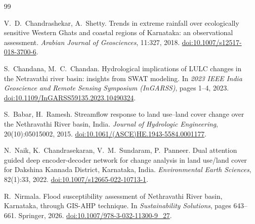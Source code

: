 \documentclass[11pt,a4paper]{article}
\begin{document}

\begin{thebibliography}{99}
\setlength{\itemsep}{1pt}

V.~D.~Chandrashekar, A.~Shetty.
Trends in extreme rainfall over ecologically sensitive Western Ghats and coastal
regions of Karnataka: an observational assessment.
\emph{Arabian Journal of Geosciences}, 11:327, 2018.
\href{https://doi.org/10.1007/s12517-018-3700-6}{doi:10.1007/s12517-018-3700-6}.

S.~Chandana, M.~C.~Chandan.
Hydrological implications of LULC changes in the Netravathi river basin:
insights from SWAT modeling.
In \emph{2023 IEEE India Geoscience and Remote Sensing Symposium (InGARSS)},
pages 1--4, 2023.
\href{https://doi.org/10.1109/InGARSS59135.2023.10490324}{doi:10.1109/InGARSS59135.2023.10490324}.

S.~Babar, H.~Ramesh.
Streamflow response to land use--land cover change over the Nethravathi River
basin, India.
\emph{Journal of Hydrologic Engineering}, 20(10):05015002, 2015.
\href{https://doi.org/10.1061/(ASCE)HE.1943-5584.0001177}{doi:10.1061/(ASCE)HE.1943-5584.0001177}.

N.~Naik, K.~Chandrasekaran, V.~M.~Sundaram, P.~Panneer.
Dual attention guided deep encoder-decoder network for change analysis in land
use/land cover for Dakshina Kannada District, Karnataka, India.
\emph{Environmental Earth Sciences}, 82(1):33, 2022.
\href{https://doi.org/10.1007/s12665-022-10713-1}{doi:10.1007/s12665-022-10713-1}.

R.~Nirmala.
Flood susceptibility assessment of Nethravathi River basin, Karnataka, through
GIS-AHP technique.
In \emph{Sustainability Solutions}, pages 643--661. Springer, 2026.
\href{https://doi.org/10.1007/978-3-032-11300-9_27}{doi:10.1007/978-3-032-11300-9\_27}.


\end{thebibliography}
\end{document}
